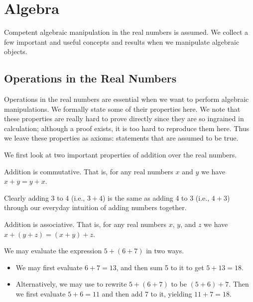 \chapter{Algebra}
Competent algebraic manipulation in the real numbers is assumed. We collect a few important and useful concepts and results when we manipulate algebraic objects.

\section{Operations in the Real Numbers}
Operations in the real numbers are essential when we want to perform algebraic manipulations. We formally state some of their properties here. We note that these properties are really hard to prove directly since they are so ingrained in calculation; although a proof exists, it is too hard to reproduce them here. Thus we leave these properties as axioms: statements that are assumed to be true.

We first look at two important properties of addition over the real numbers.
\begin{axiom}\label{axiom-addition-is-commutative}
    Addition is commutative. That is, for any real numbers $x$ and $y$ we have $x + y = y + x$.
\end{axiom}
\begin{example}
    Clearly adding 3 to 4 (i.e., $3 + 4$) is the same as adding 4 to 3 (i.e., $4 + 3$) through our everyday intuition of adding numbers together.
\end{example}

\begin{axiom}\label{axiom-addition-is-associative}
    Addition is associative. That is, for any real numbers $x$, $y$, and $z$ we have $x+(y+z) = (x+y)+z$.
\end{axiom}
\begin{example}
    We may evaluate the expression $5+(6+7)$ in two ways.
    \begin{itemize}
        \item We may first evaluate $6+7 = 13$, and then sum 5 to it to get $5 + 13 = 18$.
        \item Alternatively, we may use  to rewrite $5+(6+7)$ to be $(5+6)+7$. Then we first evaluate $5+6 = 11$ and then add 7 to it, yielding $11 + 7 = 18$.
    \end{itemize}
\end{example}

